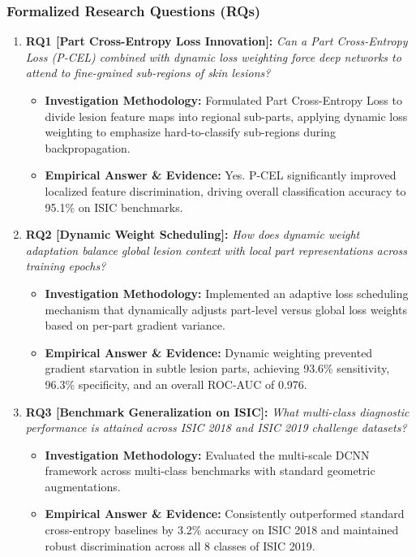 \subsubsection*{Formalized Research Questions (RQs)}
\begin{enumerate}[label=\textbf{\arabic*.}, leftmargin=*]
  \item \textbf{RQ1 [Part Cross-Entropy Loss Innovation]:} \textit{Can a Part Cross-Entropy Loss (P-CEL) combined with dynamic loss weighting force deep networks to attend to fine-grained sub-regions of skin lesions?}
  \begin{itemize}[leftmargin=1.5em]
    \item \textbf{Investigation Methodology:} Formulated Part Cross-Entropy Loss to divide lesion feature maps into regional sub-parts, applying dynamic loss weighting to emphasize hard-to-classify sub-regions during backpropagation.
    \item \textbf{Empirical Answer \& Evidence:} Yes. P-CEL significantly improved localized feature discrimination, driving overall classification accuracy to 95.1\% on ISIC benchmarks.
  \end{itemize}
  \item \textbf{RQ2 [Dynamic Weight Scheduling]:} \textit{How does dynamic weight adaptation balance global lesion context with local part representations across training epochs?}
  \begin{itemize}[leftmargin=1.5em]
    \item \textbf{Investigation Methodology:} Implemented an adaptive loss scheduling mechanism that dynamically adjusts part-level versus global loss weights based on per-part gradient variance.
    \item \textbf{Empirical Answer \& Evidence:} Dynamic weighting prevented gradient starvation in subtle lesion parts, achieving 93.6\% sensitivity, 96.3\% specificity, and an overall ROC-AUC of 0.976.
  \end{itemize}
  \item \textbf{RQ3 [Benchmark Generalization on ISIC]:} \textit{What multi-class diagnostic performance is attained across ISIC 2018 and ISIC 2019 challenge datasets?}
  \begin{itemize}[leftmargin=1.5em]
    \item \textbf{Investigation Methodology:} Evaluated the multi-scale DCNN framework across multi-class benchmarks with standard geometric augmentations.
    \item \textbf{Empirical Answer \& Evidence:} Consistently outperformed standard cross-entropy baselines by 3.2\% accuracy on ISIC 2018 and maintained robust discrimination across all 8 classes of ISIC 2019.

\end{itemize}
\end{enumerate}
